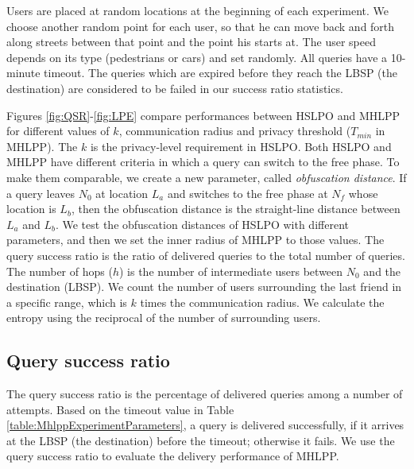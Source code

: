 Users are placed at random locations at the beginning of each experiment. We choose another random point for each user, so that he can move back and forth along streets between that point and the point his starts at. The user speed depends on its type (pedestrians or cars) and set randomly. All queries have a 10-minute timeout. The queries which are expired before they reach the LBSP (the destination) are considered to be failed in our success ratio statistics.

Figures \ref{fig:QSR}-\ref{fig:LPE} compare performances between HSLPO and MHLPP for different values of $k$, communication radius and privacy threshold (${T}_{min}$ in MHLPP). The $k$ is the privacy-level requirement in HSLPO. Both HSLPO and MHLPP have different criteria in which a query can switch to the free phase. To make them comparable, we create a new parameter, called \textit{obfuscation distance}. If a query leaves ${N}_{0}$ at location ${L}_{a}$ and switches to the free phase at ${N}_{f}$ whose location is ${L}_{b}$, then the obfuscation distance is the straight-line distance between ${L}_{a}$ and ${L}_{b}$. We test the obfuscation distances of HSLPO with different parameters, and then we set the inner radius of MHLPP to those values. The query success ratio is the ratio of delivered queries to the total number of queries. The number of hops ($h$) is the number of intermediate users between ${N}_{0}$ and the destination (LBSP). We count the number of users surrounding the last friend in a specific range, which is $k$ times the communication radius. We calculate the entropy using the reciprocal of the number of surrounding users.

\subsection{ Query success ratio}

\noindent The query success ratio is the percentage of delivered queries among a number of attempts. Based on the timeout value in Table \ref{table:MhlppExperimentParameters}, a query is delivered successfully, if it arrives at the LBSP (the destination) before the timeout; otherwise it fails. We use the query success ratio to evaluate the delivery performance of MHLPP.


